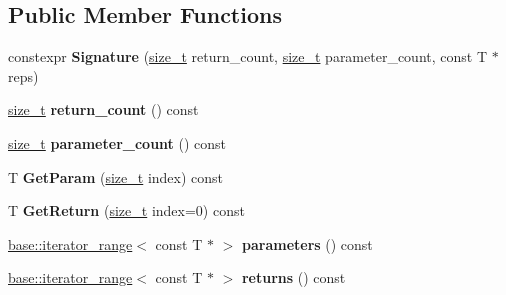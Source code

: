 \subsection*{Public Member Functions}
\begin{DoxyCompactItemize}
\item 
\mbox{\label{classv8_1_1internal_1_1Signature_afd54ed924e03e4ca029a1fc184112e1f}} 
constexpr {\bfseries Signature} (\mbox{\hyperlink{classsize__t}{size\+\_\+t}} return\+\_\+count, \mbox{\hyperlink{classsize__t}{size\+\_\+t}} parameter\+\_\+count, const T $\ast$reps)
\item 
\mbox{\label{classv8_1_1internal_1_1Signature_a0a102d5d64b769e3c24a8f13b8703483}} 
\mbox{\hyperlink{classsize__t}{size\+\_\+t}} {\bfseries return\+\_\+count} () const
\item 
\mbox{\label{classv8_1_1internal_1_1Signature_aa5b367ebd335ce254de638fba4b4dc15}} 
\mbox{\hyperlink{classsize__t}{size\+\_\+t}} {\bfseries parameter\+\_\+count} () const
\item 
\mbox{\label{classv8_1_1internal_1_1Signature_abe633f42bde09ec454bef04dceac5af7}} 
T {\bfseries Get\+Param} (\mbox{\hyperlink{classsize__t}{size\+\_\+t}} index) const
\item 
\mbox{\label{classv8_1_1internal_1_1Signature_a7f9eb8441e21966a9d5d7e6be84c81c5}} 
T {\bfseries Get\+Return} (\mbox{\hyperlink{classsize__t}{size\+\_\+t}} index=0) const
\item 
\mbox{\label{classv8_1_1internal_1_1Signature_a4ab98480026f23a31b3f83c2542bd0c7}} 
\mbox{\hyperlink{classv8_1_1base_1_1iterator__range}{base\+::iterator\+\_\+range}}$<$ const T $\ast$ $>$ {\bfseries parameters} () const
\item 
\mbox{\label{classv8_1_1internal_1_1Signature_a2286c793be7de820e27042dcb38a06f3}} 
\mbox{\hyperlink{classv8_1_1base_1_1iterator__range}{base\+::iterator\+\_\+range}}$<$ const T $\ast$ $>$ {\bfseries returns} () const
\item 
\mbox{\label{classv8_1_1internal_1_1Signature_a8ef886d3231dc051082159967d2e1305}} 

\end{DoxyCompactItemize}

